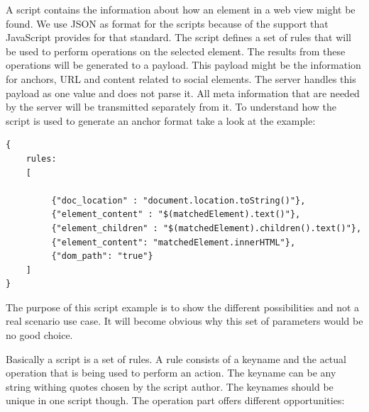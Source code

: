 A script contains the information about how an element in a web view might be found. We use JSON as format for the scripts because of the support that JavaScript provides for that standard. The script defines a set of rules that will be used to perform operations on the selected element. The results from these operations will be generated to a payload. This payload might be the information for anchors, URL and content related to social elements. The server handles this payload as one value and does not parse it. All meta information that are needed by the server will be transmitted separately from it. To understand how the script is used to generate an anchor format take a look at the example:

\begin{lstlisting}
{
    rules:
    [

         {"doc_location" : "document.location.toString()"},
         {"element_content" : "$(matchedElement).text()"},
         {"element_children" : "$(matchedElement).children().text()"},
         {"element_content": "matchedElement.innerHTML"},
         {"dom_path": "true"}	
    ]
}
\end{lstlisting}

The purpose of this script example is to show the different possibilities and not a real scenario use case. It will become obvious why this set of parameters would be no good choice. 

Basically a script is a set of rules. A rule consists of a keyname and the actual operation that is being used to perform an action. The keyname can be any string withing quotes chosen by the script author. The keynames should be unique in one script though. The operation part offers different opportunities:

